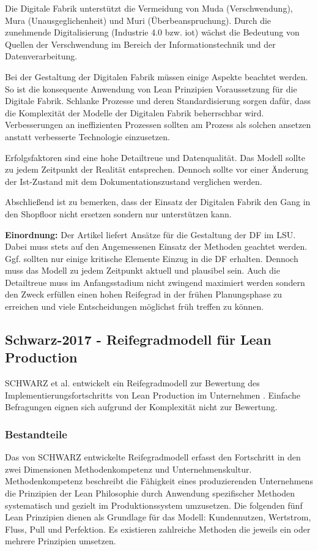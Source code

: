 Die Digitale Fabrik unterstützt die Vermeidung von Muda (Verschwendung), Mura (Unausgeglichenheit) und Muri (Überbeanspruchung). Durch die zunehmende Digitalisierung (Industrie 4.0 bzw. \gls{iot}) wächst die Bedeutung von Quellen der Verschwendung im Bereich der Informationstechnik und der Datenverarbeitung. 

Bei der Gestaltung der Digitalen Fabrik müssen einige Aspekte beachtet werden. So ist die konsequente Anwendung von Lean Prinzipien Voraussetzung für die Digitale Fabrik. Schlanke Prozesse und deren Standardisierung sorgen dafür, dass die Komplexität der Modelle der Digitalen Fabrik beherrschbar wird. 
Verbesserungen an ineffizienten Prozessen sollten am Prozess als solchen ansetzen anstatt verbesserte Technologie einzusetzen. %

Erfolgsfaktoren sind eine hohe Detailtreue und Datenqualität. Das Modell sollte zu jedem Zeitpunkt der Realität entsprechen. Dennoch sollte vor einer Änderung der Ist-Zustand mit dem Dokumentationszustand verglichen werden. 

Abschließend ist zu bemerken, dass der Einsatz der Digitalen Fabrik den Gang in den Shopfloor nicht ersetzen sondern nur unterstützen kann. 

\textbf{Einordnung:} Der Artikel liefert Ansätze für die Gestaltung der DF im LSU. Dabei muss stets auf den Angemessenen Einsatz der Methoden geachtet werden. Ggf. sollten nur einige kritische Elemente Einzug in die DF erhalten. Dennoch muss das Modell zu jedem Zeitpunkt aktuell und plausibel sein. Auch die Detailtreue muss im Anfangsstadium nicht zwingend maximiert werden sondern den Zweck erfüllen einen hohen Reifegrad in der frühen Planungsphase zu erreichen und viele Entscheidungen möglichst früh treffen zu können. 

\subsection*{Schwarz-2017 - Reifegradmodell für Lean Production}\label{sec:rgmodell}

SCHWARZ et al. entwickelt ein Reifegradmodell zur Bewertung des Implementierungsfortschritts von Lean Production im Unternehmen \cite{Schwarz2017}. Einfache Befragungen eignen sich aufgrund der Komplexität nicht zur Bewertung. 

\subsubsection{Bestandteile}
Das von SCHWARZ entwickelte Reifegradmodell erfasst den Fortschritt in den zwei Dimensionen Methodenkompetenz und Unternehmenskultur. 
Methodenkompetenz beschreibt die Fähigkeit eines produzierenden Unternehmens die Prinzipien der Lean Philosophie durch Anwendung spezifischer Methoden systematisch und gezielt im Produktionssystem umzusetzen. 
Die folgenden fünf Lean Prinzipien dienen als Grundlage für das Modell: Kundennutzen, Wertstrom, Fluss, Pull und Perfektion. 
Es existieren zahlreiche Methoden die jeweils ein oder mehrere Prinzipien umsetzen. 

